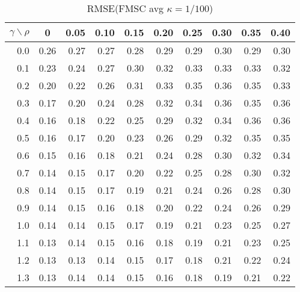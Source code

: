 \documentclass[12pt]{article}
\begin{document}
\begin{table}[!tbp]
\caption{RMSE(FMSC avg $\kappa = 1/100$)}
 \begin{center}
 \begin{tabular}{r|rrrrrrrrr}\hline\hline
\multicolumn{1}{c|}{$\gamma\backslash\rho$}&\multicolumn{1}{c}{0}&\multicolumn{1}{c}{0.05}&\multicolumn{1}{c}{0.10}&\multicolumn{1}{c}{0.15}&\multicolumn{1}{c}{0.20}&\multicolumn{1}{c}{0.25}&\multicolumn{1}{c}{0.30}&\multicolumn{1}{c}{0.35}&\multicolumn{1}{c}{0.40}\tabularnewline
\hline

0.0&0.26&0.27&0.27&0.28&0.29&0.29&0.30&0.29&0.30\tabularnewline
0.1&0.23&0.24&0.27&0.30&0.32&0.33&0.33&0.33&0.32\tabularnewline
0.2&0.20&0.22&0.26&0.31&0.33&0.35&0.36&0.35&0.33\tabularnewline
0.3&0.17&0.20&0.24&0.28&0.32&0.34&0.36&0.35&0.36\tabularnewline
0.4&0.16&0.18&0.22&0.25&0.29&0.32&0.34&0.36&0.36\tabularnewline
0.5&0.16&0.17&0.20&0.23&0.26&0.29&0.32&0.35&0.35\tabularnewline
0.6&0.15&0.16&0.18&0.21&0.24&0.28&0.30&0.32&0.34\tabularnewline
0.7&0.14&0.15&0.17&0.20&0.22&0.25&0.28&0.30&0.32\tabularnewline
0.8&0.14&0.15&0.17&0.19&0.21&0.24&0.26&0.28&0.30\tabularnewline
0.9&0.14&0.15&0.16&0.18&0.20&0.22&0.24&0.26&0.29\tabularnewline
1.0&0.14&0.14&0.15&0.17&0.19&0.21&0.23&0.25&0.27\tabularnewline
1.1&0.13&0.14&0.15&0.16&0.18&0.19&0.21&0.23&0.25\tabularnewline
1.2&0.13&0.13&0.14&0.15&0.17&0.18&0.21&0.22&0.24\tabularnewline
1.3&0.13&0.14&0.14&0.15&0.16&0.18&0.19&0.21&0.22\tabularnewline
\hline
\end{tabular}

\end{center}

\end{table}

%
\end{document}
